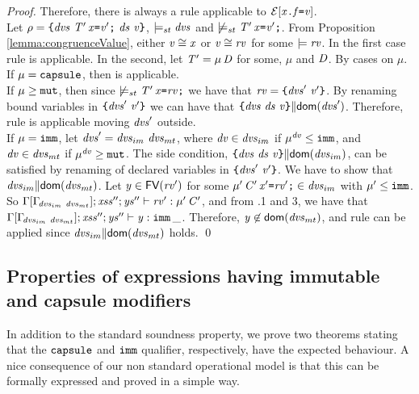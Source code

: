 {\begin{proof}
Therefore, there is always a rule applicable to ${\cal{E}}[\mathit{x}\texttt{.}\mathit{f}\texttt{=}\mathit{v}]$. \\
Let \underline{$\preRedex=\Block{\dvs\ \Dec{\T'}{\x}{\val'}\ \decs}{\val}$}, $\models_{st}\mathit{dvs}$ and $\not\models_{st}\mathit{T}'\,\mathit{x}\texttt{=}\mathit{v}'\texttt{;}$.
From Proposition \ref{lemma:congruenceValue}, either ${\mathit{v}}\cong{\mathit{x}}$ or 
${\mathit{v}}\cong{\mathit{rv}}$ for some $\models\mathit{rv}$. In the first case rule  is applicable. In the
second, let $\mathit{T}'=\mu\,\mathit{D}$ for some, $\mu$ and $\mathit{D}$. By cases on $\mu$.\\
If \underline{$\mu=\texttt{capsule}$}, then  is applicable. \\
If \underline{$\mu\geq\texttt{mut}$}, then since $\not\models_{st}\mathit{T}'\,\mathit{x}\texttt{=}\mathit{rv}\texttt{;}$ we have that $\mathit{rv}=\texttt{\{}\mathit{dvs}'\ \mathit{v}'\texttt{\}}$.
By renaming bound variables in $\texttt{\{}\mathit{dvs}'\ \mathit{v}'\texttt{\}}$ we can have that 
$\noCapture{\Block{\dvs\ \decs}{\val}}{\dom{\dvs'}}$. Therefore, rule  is applicable
moving $\mathit{dvs}'$ outside.\\
If \underline{$\mu=\texttt{imm}$},  
let $\mathit{dvs}'=\mathit{dvs}_{im}\ \mathit{dvs}_{mt}$, where $\mathit{dv}\in\mathit{dvs}_{im}$ if $\mu^{\mathit{dv}}\leq\texttt{imm}$,
and $\mathit{dv}\in\mathit{dvs}_{mt}$ if $\mu^{\mathit{dv}}\geq\texttt{mut}$. 
The side condition, 
$\noCapture{\Block{\dvs\ \decs}{\val}}{\dom{\dvs_{im}}}$, can be satisfied by renaming
of declared variables in $\texttt{\{}\mathit{dvs}'\ \mathit{v}'\texttt{\}}$. We have to show that 
$\mathit{dvs}_{im}{\parallel}\textsf{dom}(\mathit{dvs}_{mt})$. 
Let $\mathit{y}\in\textsf{FV}(\mathit{rv}')$ for some $\mu'\,\mathit{C}'\,\mathit{x}'\texttt{=}\mathit{rv}'\texttt{;}\in\mathit{dvs}_{im}$ with $\mu'\leq\texttt{imm}$. 
So $\TypeCheck{\SubstFun{\Gamma}{\TypeEnv{\dvs_{im}\ \dvs_{mt}}}}{\LentLocked''}{\StronglyLocked''}{\stVal'}{\Type{\mu'}{\C'}}$,
and from .1 and 3, we have that
$\TypeCheck{\SubstFun{\Gamma}{\TypeEnv{\dvs_{im}\ \dvs_{mt}}}}{\LentLocked''}{\StronglyLocked''}{\y}{\Type{\imm}{\_}}$.
Therefore, $\mathit{y}\not\in\textsf{dom}(\mathit{dvs}_{mt})$, and rule  can be applied
since $\mathit{dvs}_{im}{\parallel}\textsf{dom}(\mathit{dvs}_{mt})$ holds. \qed
\end{proof}

\subsection{Properties of expressions having immutable and capsule modifiers}

In addition to the standard soundness property, we prove two theorems stating that the $\texttt{capsule}$ and $\texttt{imm}$ qualifier, respectively, have the expected behaviour.  A nice consequence of our non standard operational model 
is that this can be formally expressed {and proved} in a simple way. 

}
